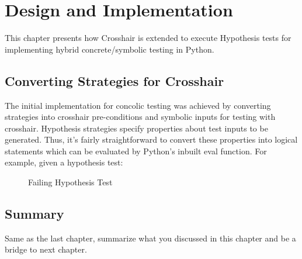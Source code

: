 \chapter{Design and Implementation}
\label{cha:design}

This chapter presents how Crosshair is extended to execute Hypothesis tests for implementing hybrid concrete/symbolic testing in Python.

\section{Converting Strategies for Crosshair}
\label{sec:des-hotpath}

The initial implementation for concolic testing was achieved by converting strategies into crosshair pre-conditions and symbolic inputs for testing with crosshair. Hypothesis strategies specify properties about test inputs to be generated. Thus, it's fairly straightforward to convert these properties into logical statements which can be evaluated by Python’s inbuilt eval function. For example, given a hypothesis test:

\begin{figure}[H]
    
    \caption{Failing Hypothesis Test}
    \label{fig:python:hello}
\end{figure}

\section{Summary}
Same as the last chapter, summarize what you discussed in this chapter and
be a bridge to next chapter.
